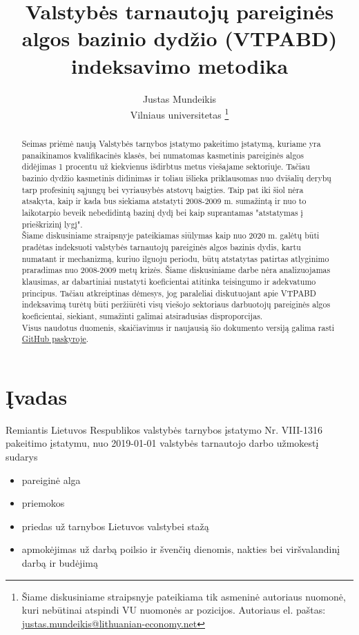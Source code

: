 \documentclass[titlepage, 11pt]{article}
\author{Justas Mundeikis\\ Vilniaus universitetas \footnote{Šiame diskusiniame straipsnyje pateikiama tik asmeninė autoriaus nuomonė, kuri nebūtinai atspindi VU nuomonės ar pozicijos. Autoriaus el. paštas: \href{mailto: justas.mundeikis@lithuanian-economy.net}{justas.mundeikis@lithuanian-economy.net} }}
\title{Valstybės tarnautojų pareiginės algos bazinio dydžio (VTPABD) \\ indeksavimo metodika}
\begin{document}
\maketitle


\begin{abstract}
Seimas priėmė naują Valstybės tarnybos įstatymo pakeitimo įstatymą, kuriame yra panaikinamos kvalifikacinės klasės, bei numatomas kasmetinis pareiginės algos didėjimas 1 procentu už kiekvienus išdirbtus metus viešajame sektoriuje. Tačiau bazinio dydžio kasmetinis didinimas ir toliau išlieka priklausomas nuo dvišalių derybų tarp profesinių sąjungų bei vyriausybės atstovų baigties. Taip pat iki šiol nėra atsakyta, kaip ir kada bus siekiama atstatyti 2008-2009 m. sumažintą ir nuo to laikotarpio beveik nebedidintą bazinį dydį bei kaip suprantamas "atstatymas į prieškrizinį lygį".\\ 
Šiame diskusiniame straipsnyje pateikiamas siūlymas kaip nuo 2020 m. galėtų būti pradėtas indeksuoti valstybės tarnautojų pareiginės algos bazinis dydis, kartu numatant ir mechanizmą, kuriuo ilguoju periodu, būtų atstatytas patirtas atlyginimo praradimas nuo 2008-2009 metų krizės. Šiame diskusiniame darbe nėra analizuojamas klausimas, ar dabartiniai nustatyti koeficientai atitinka teisingumo ir adekvatumo principus. Tačiau atkreiptinas dėmesys, jog paraleliai diskutuojant apie VTPABD indeksavimą turėtų būti peržiūrėti visų viešojo sektoriaus darbuotojų pareiginės algos koeficientai, siekiant, sumažinti galimai atsiradusias disproporcijas.\\
Visus naudotus duomenis, skaičiavimus ir naujausią šio dokumento versiją galima rasti \href{https://github.com/justasmundeikis/VTPABD}{GitHub paskyroje}.
\end{abstract}

\tableofcontents
\newpage

\section{Įvadas}
Remiantis Lietuvos Respublikos valstybės tarnybos įstatymo Nr. VIII-1316 pakeitimo įstatymu, nuo 2019-01-01 valstybės tarnautojo darbo užmokestį sudarys 
\begin{itemize}
\setlength\itemsep{-0.5em}
\item pareiginė alga
\item priemokos
\item priedas už tarnybos Lietuvos valstybei stažą
\item apmokėjimas už darbą poilsio ir švenčių dienomis, nakties bei viršvalandinį darbą ir budėjimą
\end{itemize}
\end{document}
